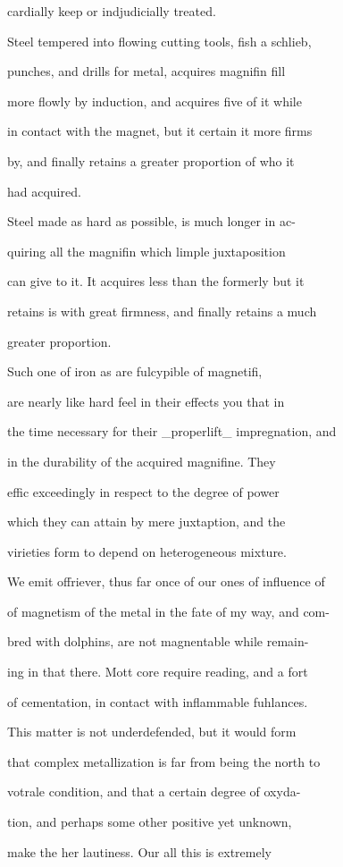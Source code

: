 \documentclass{article}
\begin{document}
cardially keep or indjudicially treated.

Steel tempered into flowing cutting tools, fish a schlieb,

punches, and drills for metal, acquires magnifin fill

more flowly by induction, and acquires five of it while

in contact with the magnet, but it certain it more firms

by, and finally retains a greater proportion of who it

had acquired.

Steel made as hard as possible, is much longer in ac-

quiring all the magnifin which limple juxtaposition

can give to it. It acquires less than the formerly but it

retains is with great firmness, and finally retains a much

greater proportion.

Such one of iron as are fulcypible of magnetifi,

are nearly like hard feel in their effects you that in

the time necessary for their \_properlift\_ impregnation, and

in the durability of the acquired magnifine. They

effic exceedingly in respect to the degree of power

which they can attain by mere juxtaption, and the

virieties form to depend on heterogeneous mixture.

We emit offriever, thus far once of our ones of influence of

of magnetism of the metal in the fate of my way, and com-

bred with dolphins, are not magnentable while remain-

ing in that there. Mott core require reading, and a fort

of cementation, in contact with inflammable fuhlances.

This matter is not underdefended, but it would form

that complex metallization is far from being the north to

votrale condition, and that a certain degree of oxyda-

tion, and perhaps some other positive yet unknown,

make the her lautiness. Our all this is extremely
\end{document}
